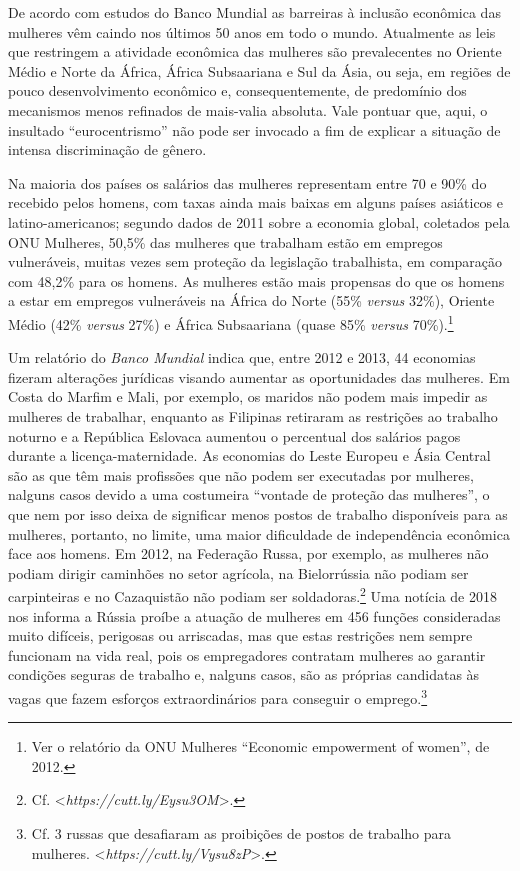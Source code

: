 De acordo com estudos do Banco Mundial as barreiras à inclusão econômica
das mulheres vêm caindo nos últimos 50 anos em todo o mundo. Atualmente
as leis que restringem a atividade econômica das mulheres são
prevalecentes no Oriente Médio e Norte da África, África Subsaariana e
Sul da Ásia, ou seja, em regiões de pouco desenvolvimento econômico e,
consequentemente, de predomínio dos mecanismos menos refinados de
mais-valia absoluta. Vale pontuar que, aqui, o insultado
``eurocentrismo'' não pode ser invocado a fim de explicar a situação de
intensa discriminação de gênero.

Na maioria dos países os salários das mulheres representam entre 70 e
90\% do recebido pelos homens, com taxas ainda mais baixas em alguns
países asiáticos e latino-americanos; segundo dados de 2011 sobre a
economia global, coletados pela ONU Mulheres, 50,5\% das mulheres que
trabalham estão em empregos vulneráveis, muitas vezes sem proteção da
legislação trabalhista, em comparação com 48,2\% para os homens. As
mulheres estão mais propensas do que os homens a estar em empregos
vulneráveis ​​na África do Norte (55\% \emph{versus} 32\%), Oriente
Médio (42\% \emph{versus} 27\%) e África Subsaariana (quase 85\%
\emph{versus} 70\%).\footnote{Ver o relatório da ONU Mulheres ``Economic
  empowerment of women'', de 2012.}

Um relatório do \emph{Banco Mundial} indica que, entre 2012 e 2013, 44
economias fizeram alterações jurídicas visando aumentar as oportunidades
das mulheres. Em Costa do Marfim e Mali, por exemplo, os maridos não
podem mais impedir as mulheres de trabalhar, enquanto as Filipinas
retiraram as restrições ao trabalho noturno e a República Eslovaca
aumentou o percentual dos salários pagos durante a licença-maternidade.
As economias do Leste Europeu e Ásia Central são as que têm mais
profissões que não podem ser executadas por mulheres, nalguns casos
devido a uma costumeira ``vontade de proteção das mulheres'', o que nem
por isso deixa de significar menos postos de trabalho disponíveis para
as mulheres, portanto, no limite, uma maior dificuldade de independência
econômica face aos homens. Em 2012, na Federação Russa, por exemplo, as
mulheres não podiam dirigir caminhões no setor agrícola, na Bielorrússia
não podiam ser carpinteiras e no Cazaquistão não podiam ser
soldadoras.\footnote{Cf.
  \textless{}\emph{https://cutt.ly/Eysu3OM}\textgreater{}.}
Uma notícia de 2018 nos informa a Rússia proíbe a atuação de mulheres em
456 funções consideradas muito difíceis, perigosas ou arriscadas, mas
que estas restrições nem sempre funcionam na vida real, pois os
empregadores contratam mulheres ao garantir condições seguras de
trabalho e, nalguns casos, são as próprias candidatas às vagas que fazem
esforços extraordinários para conseguir o emprego.\footnote{Cf. 3 russas
  que desafiaram as proibições de postos de trabalho para mulheres.
  \textless{}\emph{https://cutt.ly/Vysu8zP}\textgreater{}.}

